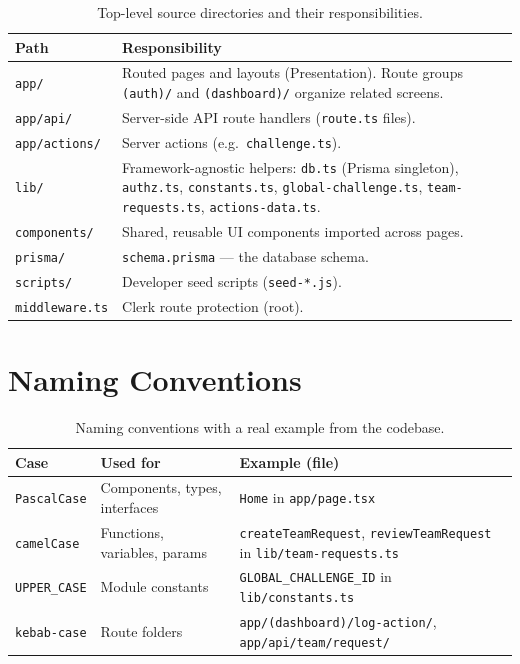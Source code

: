 \documentclass[11pt]{article}
\begin{document}
\begin{table}[H]
\centering
\caption{Top-level source directories and their responsibilities.}
\label{tab:struct}
\begin{tabular}{p{3.6cm} p{9.6cm}}
\toprule
Path & Responsibility \\
\midrule
\texttt{app/} & Routed pages and layouts (Presentation). Route groups
\texttt{(auth)/} and \texttt{(dashboard)/} organize related screens. \\
\texttt{app/api/} & Server-side API route handlers (\texttt{route.ts} files). \\
\texttt{app/actions/} & Server actions (e.g.\ \texttt{challenge.ts}). \\
\texttt{lib/} & Framework-agnostic helpers: \texttt{db.ts} (Prisma singleton),
\texttt{authz.ts}, \texttt{constants.ts}, \texttt{global-challenge.ts},
\texttt{team-requests.ts}, \texttt{actions-data.ts}. \\
\texttt{components/} & Shared, reusable UI components imported across
pages. \\
\texttt{prisma/} & \texttt{schema.prisma} --- the database schema. \\
\texttt{scripts/} & Developer seed scripts (\texttt{seed-*.js}). \\
\texttt{middleware.ts} & Clerk route protection (root). \\
\bottomrule
\end{tabular}
\end{table}

\section{Naming Conventions}

\begin{table}[H]
\centering
\caption{Naming conventions with a real example from the codebase.}
\label{tab:naming}
\begin{tabular}{p{3.0cm} p{4.4cm} p{5.6cm}}
\toprule
Case & Used for & Example (file) \\
\midrule
\texttt{PascalCase} & Components, types, interfaces &
\texttt{Home} in \texttt{app/page.tsx} \\
\texttt{camelCase} & Functions, variables, params &
\texttt{createTeamRequest}, \texttt{reviewTeamRequest} in
\texttt{lib/team-requests.ts} \\
\texttt{UPPER\_CASE} & Module constants &
\texttt{GLOBAL\_CHALLENGE\_ID} in \texttt{lib/constants.ts} \\
\texttt{kebab-case} & Route folders &
\texttt{app/(dashboard)/log-action/}, \texttt{app/api/team/request/} \\
\bottomrule
\end{tabular}
\end{table}
\end{document}
